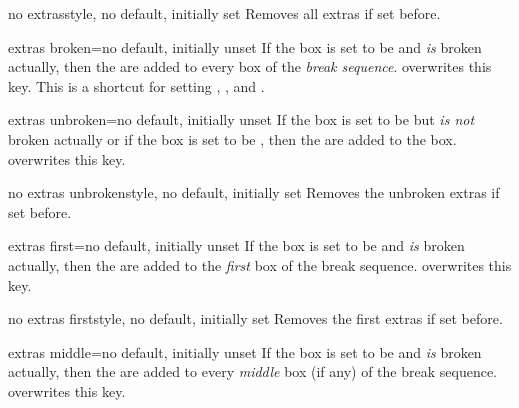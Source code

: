 \begin{docTcbKey}[][doc new=2015-07-16]{no extras}{}{style, no default, initially set}
  Removes all extras if set before.
\end{docTcbKey}


\begin{docTcbKey}[][doc new=2015-07-16]{extras broken}{=}{no default, initially unset}
  If the box is set to be  and \emph{is} broken actually,
  then the  are added to every box of the \emph{break sequence}.
   overwrites this key.
  This is a shortcut for setting
  , , and .
\end{docTcbKey}

\begin{docTcbKey}[][doc new=2015-07-16]{extras unbroken}{=}{no default, initially unset}
  If the box is set to be  but \emph{is not} broken actually
  or if the box is set to be ,
  then the  are added to the box.
   overwrites this key.
\end{docTcbKey}

\begin{docTcbKey}[][doc new=2015-07-16]{no extras unbroken}{}{style, no default, initially set}
  Removes the unbroken extras if set before.
\end{docTcbKey}

\begin{docTcbKey}[][doc new=2015-07-16]{extras first}{=}{no default, initially unset}
  If the box is set to be  and \emph{is} broken actually,
  then the  are added to the \emph{first} box of the break sequence.
   overwrites this key.
\end{docTcbKey}

\begin{docTcbKey}[][doc new=2015-07-16]{no extras first}{}{style, no default, initially set}
  Removes the first extras if set before.
\end{docTcbKey}

\begin{docTcbKey}[][doc new=2015-07-16]{extras middle}{=}{no default, initially unset}
  If the box is set to be  and \emph{is} broken actually,
  then the  are added to every \emph{middle} box (if any) of the break sequence.
   overwrites this key.
\end{docTcbKey}

